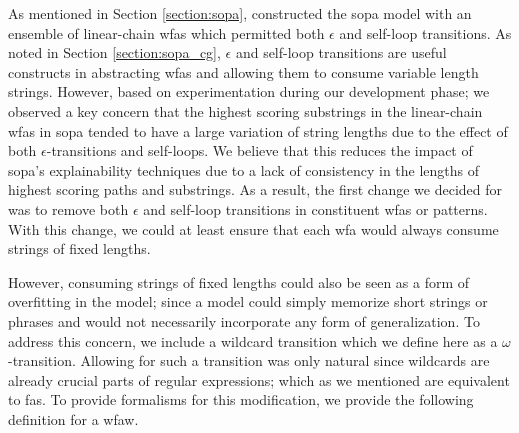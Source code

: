 As mentioned in Section \ref{section:sopa}, \citet{schwartz2018sopa} constructed
the \ac{sopa} model with an ensemble of linear-chain \ac{wfas} which permitted both
$\epsilon$ and self-loop transitions. As noted in Section \ref{section:sopa_cg},
$\epsilon$ and self-loop transitions are useful constructs in abstracting \ac{wfas}
and allowing them to consume variable length strings. However, based on
experimentation during our development phase; we observed a key concern that the
highest scoring substrings in the linear-chain \ac{wfas} in \ac{sopa} tended to have a
large variation of string lengths due to the effect of both
$\epsilon$-transitions and self-loops. We believe that this reduces the impact
of \ac{sopa}'s explainability techniques due to a lack of consistency in the lengths
of highest scoring paths and substrings. As a result, the first change we decided
for was to remove both $\epsilon$ and self-loop transitions in constituent \ac{wfas}
or patterns. With this change, we could at least ensure that each \ac{wfa} would
always consume strings of fixed lengths.

However, consuming strings of fixed lengths could also be seen as a form of
overfitting in the model; since a model could simply memorize short strings or
phrases and would not necessarily incorporate any form of generalization. To
address this concern, we include a wildcard transition which we define here as a
$\omega$-transition. Allowing for such a transition was only natural since
wildcards are already crucial parts of regular expressions; which as we
mentioned are equivalent to \ac{fas}. To provide formalisms for this modification, we
provide the following definition for a \ac{wfaw}.

